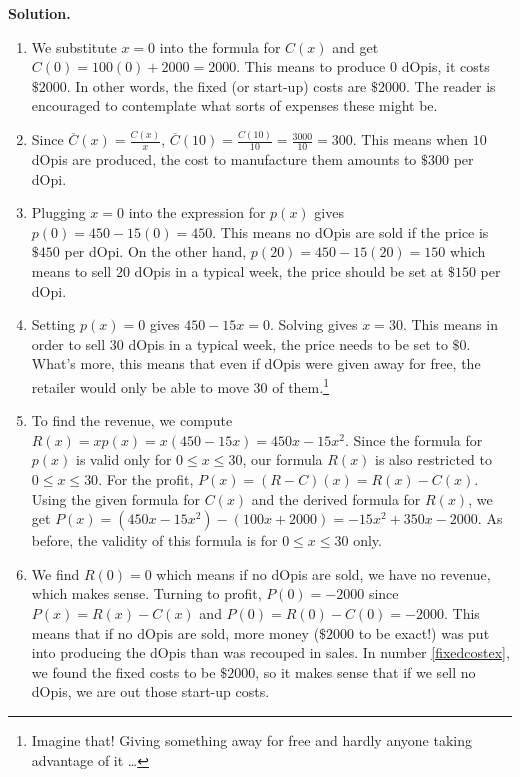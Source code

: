 \documentclass{ximera}
\begin{document}
\begin{example}
\vspace{-.2in}

\pagebreak

{\bf Solution.}

\begin{enumerate}

\item \label{fixedcostex} We substitute $x=0$ into the formula for $C(x)$ and get $C(0) = 100(0) + 2000 = 2000$.  This means to produce $0$ dOpis, it costs $\$2000$.  In other words, the fixed (or start-up) costs are $\$2000$. The reader is encouraged to contemplate what sorts of expenses these might be.

\item  Since $\overline{C}(x) = \frac{C(x)}{x}$, $\overline{C}(10) = \frac{C(10)}{10} = \frac{3000}{10} = 300$.  This means when $10$ dOpis are produced, the cost to manufacture them amounts to $\$ 300$ per dOpi.

\item Plugging $x=0$ into the expression for $p(x)$ gives $p(0) = 450 - 15(0) = 450$.  This means no dOpis are sold if the price is  $\$450$ per dOpi.  On the other hand, $p(20) = 450-15(20) = 150$ which means to sell $20$ dOpis in a typical week, the price should be set at $\$150$ per dOpi.

\item  Setting $p(x) = 0$ gives $450-15x = 0$.  Solving gives $x = 30$.  This means in order to sell $30$ dOpis in a typical week, the price needs to be set to $\$ 0$. What's more, this means that even if dOpis were given away for free, the retailer would only be able to move $30$ of them.\footnote{Imagine that!  Giving something away for free and hardly anyone taking advantage of it \ldots}

\item  To find the revenue, we compute $R(x) = x p(x) = x (450 - 15x) = 450x - 15x^2$.  Since the formula for $p(x)$ is valid only for $0 \leq x \leq 30$, our formula $R(x)$ is also restricted to $0 \leq x \leq 30$.  For the profit, $P(x) = (R-C)(x) = R(x) - C(x)$.  Using the given formula for $C(x)$ and the derived formula for $R(x)$, we get $P(x) = \left(450x - 15x^2\right) -(100x+2000) = -15x^2+350x-2000$. As before, the validity of this formula is for $0 \leq x \leq 30$ only.

\item  We find $R(0) = 0$ which means if no dOpis are sold, we have no revenue, which makes sense.  Turning to profit, $P(0) = -2000$ since $P(x) = R(x) - C(x)$ and $P(0) = R(0) - C(0) = -2000$.  This means that if no dOpis are sold, more money ($\$2000$ to be exact!) was put into producing the dOpis than was recouped in sales. In number \ref{fixedcostex}, we found the fixed costs to be $\$2000$, so it makes sense that if we sell no dOpis, we are out those start-up costs. 


\end{enumerate}
\end{example}
\end{document}
